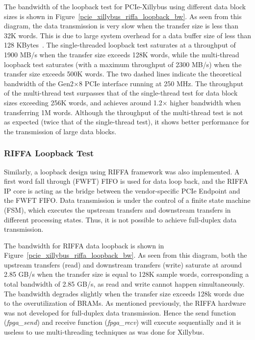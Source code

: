 The bandwidth of the loopback test for PCIe-Xillybus using different data block sizes is shown in Figure~\ref{pcie_xillybus_riffa_loopback_bw}. 
As seen from this diagram, the data transmission is very slow when the transfer size is less than 32K words. 
This is due to large system overhead for a data buffer size of less than 128 KBytes~\cite{xillybus2018}. 
The single-threaded loopback test saturates at a throughput of 1900 MB/s when the transfer size exceeds 128K words, while the multi-thread loopback test saturates (with a maximum throughput of 2300 MB/s) when the transfer size exceeds 500K words. 
The two dashed lines indicate the theoretical bandwidth of the Gen2$\times$8 PCIe interface running at 250 MHz.
The throughput of the multi-thread test surpasses that of the single-thread test for data block sizes exceeding 256K words, and achieves around 1.2$\times$ higher bandwidth when transferring 1M words. 
Although the throughput of the multi-thread test is not as expected (twice that of the single-thread test), it shows better performance for the transmission of large data blocks. 



\subsubsection{RIFFA Loopback Test}
Similarly, a loopback design using RIFFA framework was also implemented. 
A first word fall through (FWFT) FIFO is used for data loop back, and the RIFFA IP core is acting as the bridge between the vendor-specific PCIe Endpoint and the FWFT FIFO. 
Data transmission is under the control of a finite state machine (FSM), which executes the upstream transfers and downstream transfers in different processing states.  
Thus, it is not possible to achieve full-duplex data transmission. 

The bandwidth for RIFFA data loopback is shown in Figure~\ref{pcie_xillybus_riffa_loopback_bw}. 
As seen from this diagram, both the upstream transfers (read) and downstream transfers (write) saturate at around 2.85 GB/s when the transfer size is equal to 128K sample words, corresponding a total bandwidth of 2.85 GB/s, as read and write cannot happen simultaneously. 
The bandwidth degrades slightly when the transfer size exceeds 128k words due to the overutilization of BRAMs.
As mentioned previously, the RIFFA hardware was not developed for full-duplex data transmission. 
Hence the send function (\textit{fpga\_send}) and receive function (\textit{fpga\_recv}) will execute sequentially and it is useless to use multi-threading techniques as was done for Xillybus. 

